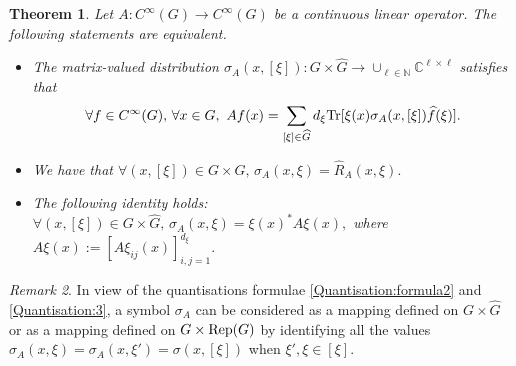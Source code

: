 \documentclass[12pt, reqno]{amsart}
\newtheorem{theorem}{Theorem}[section]
\theoremstyle{definition}
\theoremstyle{remark}
\newtheorem{remark}[theorem]{Remark}
\numberwithin{equation}{section}
\begin{document}
\begin{theorem}\label{The:quantisation:thm}
    Let $A:C^\infty(G)\rightarrow C^\infty(G) $ be a continuous linear operator. The following statements are equivalent.
    \begin{itemize}
        \item The matrix-valued distribution $\sigma_A(x,[\xi]):G\times \widehat{G}\rightarrow \cup_{\ell\in \mathbb{N}}\mathbb{C}^{\ell\times \ell}$ satisfies that
        \begin{equation}\label{Quantisation:3}
            \forall f\in C^\infty(G),\,\forall x\in G,\,\, Af(x)=\sum_{[\xi]\in \widehat{G}}d_\xi\textnormal{Tr}[\xi(x)\sigma_{A}(x,[\xi])\widehat{f}(\xi)].
        \end{equation}
        \item We have that $ 
            \forall (x,[\xi])\in G\times \widehat{G},\, \sigma_{A}(x,\xi)=\widehat{R}_A(x,\xi).
        $ \\
        \item  The following identity holds: $ 
          \forall (x,[\xi])\in G\times \widehat{G},\, \sigma_A(x,\xi)=\xi(x)^{*}A\xi(x),$ where $ A\xi(x):=[A\xi_{ij}(x)]_{i,j=1}^{d_\xi}.  
        $ 
    \end{itemize}
\end{theorem}
\begin{remark}
    In view of the quantisations formulae \eqref{Quantisation:formula2} and \eqref{Quantisation:3}, a symbol $\sigma_A$ can be considered as a mapping defined on $G\times \widehat{G}$ or as a mapping  defined on $ G\times \textnormal{Rep}(G)$ by identifying all the values $\sigma_A(x,\xi)=\sigma_A(x,\xi')=\sigma(x,[\xi])$ when $\xi',\xi\in [\xi].$
\end{remark}
\end{document}

